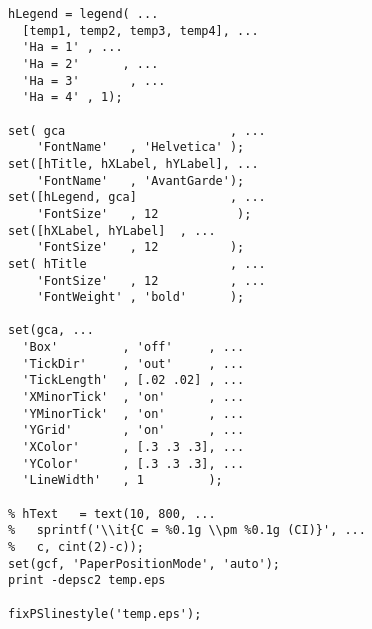 \begin{lstlisting}
hLegend = legend( ...
  [temp1, temp2, temp3, temp4], ...
  'Ha = 1' , ...
  'Ha = 2'      , ...
  'Ha = 3'       , ...
  'Ha = 4' , 1);

set( gca                       , ...
    'FontName'   , 'Helvetica' );
set([hTitle, hXLabel, hYLabel], ...
    'FontName'   , 'AvantGarde');
set([hLegend, gca]             , ...
    'FontSize'   , 12           );
set([hXLabel, hYLabel]  , ...
    'FontSize'   , 12          );
set( hTitle                    , ...
    'FontSize'   , 12          , ...
    'FontWeight' , 'bold'      );

set(gca, ...
  'Box'         , 'off'     , ...
  'TickDir'     , 'out'     , ...
  'TickLength'  , [.02 .02] , ...
  'XMinorTick'  , 'on'      , ...
  'YMinorTick'  , 'on'      , ...
  'YGrid'       , 'on'      , ...
  'XColor'      , [.3 .3 .3], ...
  'YColor'      , [.3 .3 .3], ...
  'LineWidth'   , 1         );

% hText   = text(10, 800, ...
%   sprintf('\\it{C = %0.1g \\pm %0.1g (CI)}', ...
%   c, cint(2)-c));
set(gcf, 'PaperPositionMode', 'auto');
print -depsc2 temp.eps

fixPSlinestyle('temp.eps');

\end{lstlisting}

